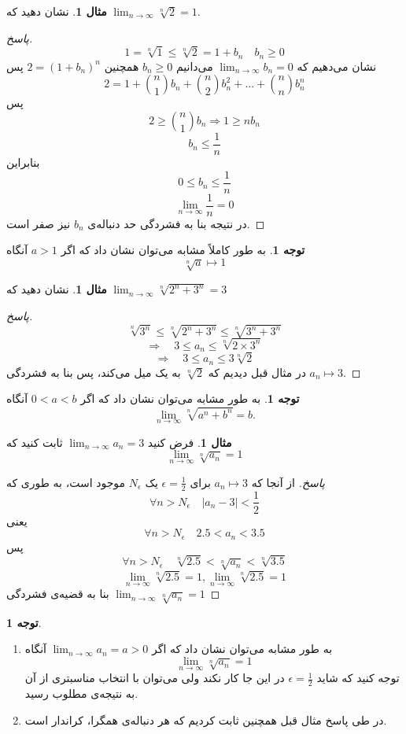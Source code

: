 \documentclass[12pt,a4paper]{article}
\theoremstyle{definition}
\newtheorem{mesal}[thm]{مثال}
\newtheorem{tav}[thm]{توجه}
\begin{document}
\begin{mesal}
نشان دهید که 
$\lim_{n \to \infty}\sqrt[n]{2}=1$.
\end{mesal}
\begin{proof}[پاسخ]
\[
1=\sqrt[n]{1} \leqslant \sqrt[n]{2}=1+b_n \quad b_n \geqslant 0
\]
نشان می‌دهیم که 
$\lim_{n \to \infty} b_n =0$
می‌دانیم 
$b_n \geqslant 0$
همچنین
$2=(1+b_n)^n$
پس
\[
2=1+\binom{n}{1}b_n+\binom{n}{2}b_n^2+...+\binom{n}{n}b_n^n
\]
پس
\[
2\geq \binom{n}{1}b_n\Rightarrow
1 \geqslant nb_n
\]
\[
b_n \leqslant \frac{1}{n}
\]
بنابراین
\[
0 \leqslant b_n \leqslant \frac{1}{n}
\]
\[
\lim_{n \to \infty} \frac{1}{n}=0
\]
در نتیجه بنا به فشردگی حد دنباله‌ی 
$b_n$
نیز صفر است.
\end{proof}
\begin{tav}
به طور کاملاً مشابه می‌توان نشان داد که اگر 
$a>1$
آنگاه
\[
\sqrt[n]{a} \mapsto 1
\]
\end{tav}
\begin{mesal}
نشان دهید که 
$\lim_{n \to \infty}\sqrt[n]{2^n+3^n}=3$
\end{mesal}
\begin{proof}[پاسخ]
\[
\sqrt[n]{3^n} \leqslant \sqrt[n]{2^n+3^n} \leqslant \sqrt[n]{3^n+3^n}
\]
\[
\Rightarrow \quad 3 \leqslant a_n \leqslant \sqrt[n]{2 \times 3^n}
\]
\[
\Rightarrow \quad 3 \leqslant a_n \leqslant 3\sqrt[n]{2}
\]
در مثال قبل دیدیم 
که
$\sqrt[n]{2}$
به یک میل می‌کند، پس بنا به فشردگی
$a_n \mapsto 3$.
\end{proof}
\begin{tav}
به طور مشابه می‌توان نشان داد که اگر 
$0<a<b$
آنگاه
\[
\lim_{n \to \infty}\sqrt[n]{a^n+b^n}=b.
\]
\end{tav}
\begin{mesal}
فرض کنید 
$\lim_{n \to \infty}a_n=3$
ثابت کنید که 
\[
\lim_{n \to \infty}\sqrt[n]{a_n}=1
\]
\end{mesal}
\begin{proof}[پاسخ]
از آنجا که 
$a_n \mapsto 3$
برای 
$\epsilon = \frac{1}{2}$
یک 
$N_\epsilon$
 موجود است، به طوری که
\[
\forall n >N_\epsilon \quad |a_n-3|<\frac{1}{2}
\]
یعنی
\[
\forall n>N_\epsilon \quad 2.5<a_n<3.5
\]
پس
\[
\forall n>N_\epsilon \quad \sqrt[n]{2.5}<\sqrt[n]{a_n}<\sqrt[n]{3.5}
\]
\[
\lim_{n \to \infty}\sqrt[n]{2.5}=1 , \lim_{n \to \infty}\sqrt[n]{2.5}=1
\]
بنا به قضیه‌ی فشردگی 
$\lim_{n \to \infty}\sqrt[n]{a_n}=1$
\end{proof}
\begin{tav}
\begin{enumerate}\hfill
\item
به طور مشابه می‌توان نشان داد که اگر 
$\lim_{n \to \infty}a_n=a>0$
آنگاه 
\[
\lim_{n \to \infty}\sqrt[n]{a_n}=1
\]
توجه کنید که شاید
$\epsilon=\frac{1}{2}$
در این جا کار نکند ولی می‌توان با انتخاب مناسبتری از آن به نتیجه‌ی مطلوب رسید. 
\item
در طی پاسخ مثال قبل همچنین ثابت کردیم که هر دنباله‌ی همگرا، کراندار است.
\end{enumerate}
\end{tav}
\end{document}
